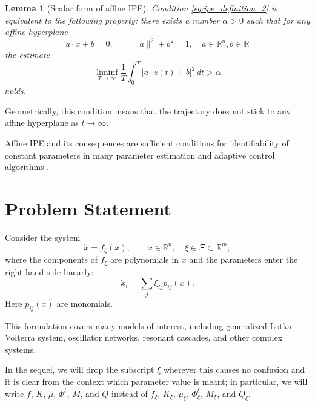 \documentclass[11pt]{article}
\newcommand{\R}{\mathbb{R}}
\newcommand{\dd}{\,d}
\theoremstyle{thmstyleone}
\newtheorem{lemma}[theorem]{Lemma}
\theoremstyle{thmstyletwo}
\theoremstyle{thmstylethree}
\begin{document}
\begin{lemma}[Scalar form of affine IPE]
\label{lem:scalar_ipe_equivalence_2}
Condition \eqref{eq:ipe_definition_2} is equivalent to the following property: there exists a number $\alpha>0$ such that for any affine hyperplane
\[
    a\cdot x+b=0,
    \qquad \|a\|^2+b^2=1, \quad a \in \R^n , b \in \R
\]
the estimate
\begin{equation}\label{eq:ipe_scalar_2}
    \liminf_{T\to\infty}
    \frac1T\int_0^T |a\cdot z(t)+b|^2\dd t
    >\alpha
\end{equation}
holds.

\end{lemma}
Geometrically, this condition means that the trajectory does not stick to any affine hyperplane as $t \rightarrow \infty$.

Affine IPE and its consequences are sufficient conditions for identifiability of constant parameters in many parameter estimation and adaptive control algorithms \cite{AeyelsSepulchre1994,NarendraAnnaswamy1987}.

\section{Problem Statement}
\label{sec:problem}

Consider the system
\begin{equation}\label{eq:polynomial_system_2}
    \dot x=f_\xi(x),\qquad x\in\R^n,
    \quad \xi\in\Xi\subset\R^m,
\end{equation}
where the components of $f_\xi$ are polynomials in $x$ and the parameters enter the right‑hand side linearly:
\begin{equation}\label{eq:linear_parameterization_2}
    \dot{x}_i=\sum_{j}\xi_{ij}p_{ij}(x).
\end{equation}
Here $p_{ij}(x)$ are monomials. 

This formulation covers many models of interest, including generalized Lotka--Volterra system, oscillator networks, resonant cascades, and other complex systems.


In the sequel, we will drop the subscript $\xi$ wherever this causes no confusion and it is clear from the context which parameter value is meant; in particular, we will write $f$, $K$, $\mu$, $\Phi^t$, $M$, and $Q$ instead of $f_\xi$, $K_\xi$, $\mu_\xi$, $\Phi_\xi^t$, $M_\xi$, and $Q_\xi$.
\end{document}
